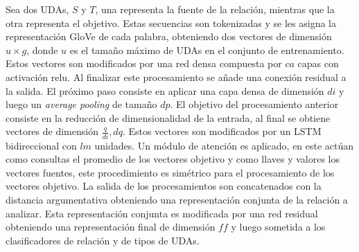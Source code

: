Sea dos UDAs, $S$ y $T$, una representa la fuente de la relación, mientras que la otra representa
el objetivo. Estas secuencias son tokenizadas y se les asigna la representación GloVe de cada palabra, obteniendo
dos vectores de dimensión $u \times g$, donde $u$ es el tamaño máximo de UDAs en el conjunto de entrenamiento.
Estos vectores son modificados por una red densa compuesta por $ca$ capas con activación relu. 
Al finalizar este procesamiento se añade una conexión residual
a la salida. El próximo paso consiste en aplicar una capa densa de dimensión $di$ y luego un \emph{average pooling}
de tamaño $dp$. El objetivo del procesamiento anterior consiste
en la reducción de dimensionalidad de la entrada, al final se obtiene vectores de dimensión $\frac{q}{di}, dq$. 
Estos vectores son modificados por un LSTM bidireccional con $lm$ unidades. Un módulo de atención es aplicado, 
en este actúan como consultas el promedio de los vectores objetivo y como llaves y valores los vectores fuentes,
este procedimiento es simétrico para el procesamiento de los vectores objetivo.
La salida de los procesamientos son concatenados con la distancia argumentativa obteniendo una representación 
conjunta de la relación a analizar. Esta representación conjunta es modificada por una red residual obteniendo
una representación final de dimensión $ff$ y luego sometida a los clasificadores de relación y de tipos de UDAs.

